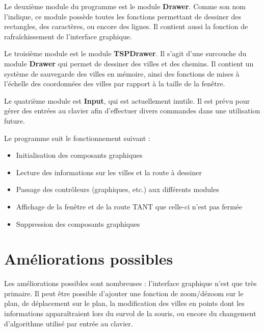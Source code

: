 Le deuxième module du programme est le module \textbf{Drawer}. Comme son nom l'indique, ce module possède toutes les fonctions permettant de dessiner des rectangles, des caractères, ou encore des lignes. Il contient aussi la fonction de rafraîchissement de l'interface graphique.

Le troisième module est le module \textbf{TSPDrawer}. Il s'agit d'une surcouche du module \textbf{Drawer} qui permet de dessiner des villes et des chemins. Il contient un système de sauvegarde des villes en mémoire, ainsi des fonctions de mises à l'échelle des coordonnées des villes par rapport à la taille de la fenêtre.

Le quatrième module est \textbf{Input}, qui est actuellement inutile. Il est prévu pour gérer des entrées au clavier afin d'effectuer divers commandes dans une utilisation future.

Le programme suit le fonctionnement suivant :
\begin{itemize}
	\item Initialisation des composants graphiques
	\item Lecture des informations sur les villes et la route à dessiner
	\item Passage des contrôleurs (graphiques, etc.) aux différents modules
	\item Affichage de la fenêtre et de la route TANT que celle-ci n'est pas fermée
	\item Suppression des composants graphiques
\end{itemize}

\section{Améliorations possibles}

Les améliorations possibles sont nombreuses : l'interface graphique n'est que très primaire. Il peut être possible d'ajouter une fonction de zoom/dézoom sur le plan, de déplacement sur le plan, la modification des villes en points dont les informations apparaîtraient lors du survol de la souris, ou encore du changement d'algorithme utilisé par entrée au clavier.